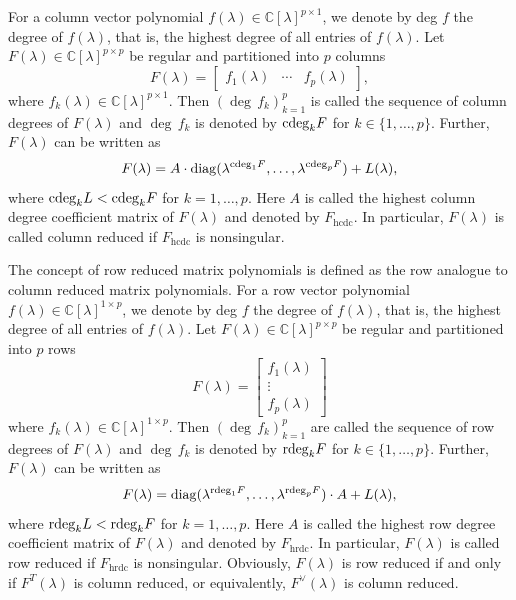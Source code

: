 \documentclass[12pt,reqno]{amsart}
\theoremstyle{plain}
\numberwithin{equation}{section}
\theoremstyle{remark}
\begin{document}
   For a column vector polynomial $f(\lambda)\in \mathbb{C}[\lambda]^{p\times 1}$, we  denote by deg $f$ the degree of  $f(\lambda)$, that is, the highest degree of all entries of $f(\lambda)$.
Let $F(\lambda)\in \mathbb C[\lambda]^{p\times p}$ be regular and partitioned into $p$ columns
\begin{equation}\label{Partition}
F(\lambda)=\begin{bmatrix} f_1(\lambda) & \cdots & f_p(\lambda)\end{bmatrix},
\end{equation}
where $f_k(\lambda)\in \mathbb C[\lambda]^{p\times 1}$. 
Then $({\deg\, f_k})_{k=1}^p$ is called the sequence of column degrees of $F(\lambda)$ and $\deg\, f_k$ is denoted by ${\rm cdeg}_k F$ for $k\in \{1,\ldots,p\}$. Further, $F(\lambda)$ can be written as 
$$
F(\lambda)=A\cdot {\rm diag}(\lambda^{{\rm cdeg}_1 F},\ldots, \lambda^{{\rm cdeg}_p F})+L(\lambda),
$$
where ${\rm cdeg}_k L<{\rm cdeg}_k F$ for $k=1,\ldots,p$.
Here $A$ is called the highest column degree coefficient matrix of $F(\lambda)$ and denoted by $F_{\mathrm{hcdc}}$.
In particular,
$F(\lambda)$ is called column reduced if $F_{\mathrm{hcdc}}$ is nonsingular.

The concept of row reduced matrix polynomials is defined as the row analogue to column reduced matrix polynomials. For a row vector polynomial $f(\lambda)\in \mathbb{C}[\lambda]^{1\times p}$, we  denote by deg $f$ the degree of  $f(\lambda)$, that is, the highest degree of all entries of $f(\lambda)$. Let $F(\lambda)\in \mathbb C[\lambda]^{p\times p}$ be regular and partitioned into $p$ rows
\begin{equation*}
F(\lambda)=\begin{bmatrix}
f_1(\lambda)\\
\vdots\\
f_p(\lambda)
\end{bmatrix}
\end{equation*}
where $f_k(\lambda)\in \mathbb C[\lambda]^{1\times p}$. 
Then $({\deg\, f_k})_{k=1}^p$ are called the sequence of row degrees of $F(\lambda)$ and $\deg\, f_k$ is denoted by ${\rm rdeg}_k F$ for $k\in \{1,\ldots,p\}$. Further, $F(\lambda)$ can be written as
$$
F(\lambda)={\rm diag}(\lambda^{{\rm rdeg}_1 F},\ldots,\lambda^{{\rm rdeg}_p F})\cdot A+L(\lambda),
$$
where ${\rm rdeg}_k L<{\rm rdeg}_k F$ for $k=1,\ldots,p$. Here $A$ is called the highest row degree coefficient matrix of $F(\lambda)$ and denoted by $F_{\mathrm{hrdc}}$.
In particular,
$F(\lambda)$ is called row reduced if $F_{\mathrm{hrdc}}$ is nonsingular.
Obviously, $F(\lambda)$ is row reduced if and only if $F^{T}(\lambda)$ is column reduced, or equivalently, $F^{\vee}(\lambda)$ is column reduced.
\end{document}
